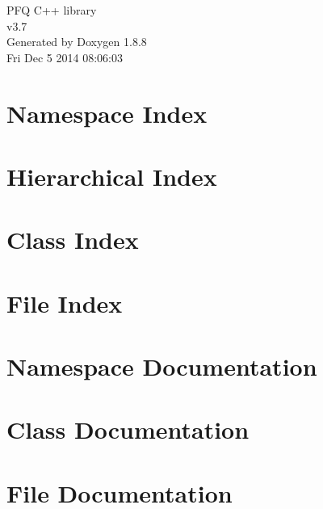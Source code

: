 \documentclass[twoside]{book}
\newcommand{\+}{\discretionary{\mbox{\scriptsize$\hookleftarrow$}}{}{}}
\newcommand{\clearemptydoublepage}{%
  \newpage{\pagestyle{empty}\cleardoublepage}%
}
\begin{document}
\hypersetup{pageanchor=false,
             bookmarks=true,
             bookmarksnumbered=true,
             pdfencoding=unicode
            }
\begin{titlepage}
\vspace*{7cm}
\begin{center}%
{\Large P\+F\+Q C++ library \\[1ex]\large v3.\+7 }\\
\vspace*{1cm}
{\large Generated by Doxygen 1.8.8}\\
\vspace*{0.5cm}
{\small Fri Dec 5 2014 08:06:03}\\
\end{center}
\end{titlepage}
\clearemptydoublepage
\tableofcontents
\clearemptydoublepage
{}
\hypersetup{pageanchor=true}

\chapter{Namespace Index}

\chapter{Hierarchical Index}

\chapter{Class Index}

\chapter{File Index}

\chapter{Namespace Documentation}



\chapter{Class Documentation}
















\chapter{File Documentation}





\newpage
{}
{}
\printindex
\end{document}
